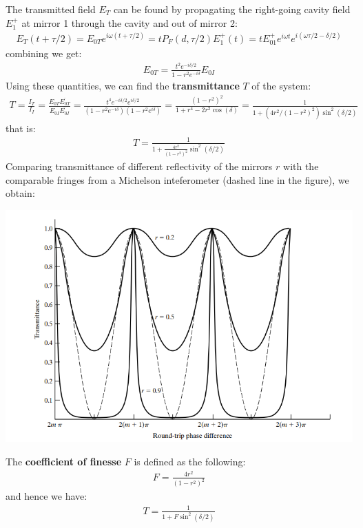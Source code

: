 \documentclass[11pt]{book}
\theoremstyle{break}
\theoremstyle{break}
\begin{document}
The transmitted field $E_T$ can be found by propagating the right-going cavity field $E_1^+$ at mirror 1 through the cavity and out of mirror 2:
\begin{align*}
E_T(t + \tau/2) = E_{0T}e^{i\omega(t+ \tau/2)}=tP_F(d, \tau/2) E_1^+(t) = tE_{01}^+e^{i\omega t}e^{i(\omega \tau/2 - \delta /2)}
\end{align*}
combining we get:
\begin{align*}
E_{0T} = \frac{t^2 e^{-i \delta/2}}{1-r^2 e^{-i\delta}} E_{0I}
\end{align*}
Using these quantities, we can find the \textbf{transmittance} $T$ of the system:
\begin{align*}
T=\frac{I_T}{I_I} = \frac{E_{0T}\overline{E_{0T}}}{E_{0I}\overline{E_{0I}}} = \frac{t^4 e^{-i\delta/2}e^{i\delta/2}}{(1-r^2 e^{-i\delta}) ( 1- r^2 e^{i\delta})} = \frac{(1-r^2)^2}{1+r^4 - 2r^2 \cos(\delta)} = \frac{1}{1+(4r^2/(1-r^2)^2) \sin^2(\delta/2)}
\end{align*}
that is:
\begin{align}
T = \frac{1}{1+\frac{4r^2}{(1-r^2)^2} \sin^2(\delta/2)}\tag{Airy
function}
\end{align}
Comparing transmittance of different reflectivity of the mirrors $r$ with the comparable fringes from a Michelson inteferometer (dashed line in the figure), we obtain:
\begin{center}
\includegraphics[scale=1]{rtpd.png}
\end{center}
\newpage
The \textbf{coefficient of finesse} $F$ is defined as the following:
\begin{align*}
F = \frac{4r^2}{(1-r^2)^2}
\end{align*}
and hence we have:
\begin{align*}
T = \frac{1}{1+F\sin^2(\delta/2)}
\end{align*}
\end{document}
